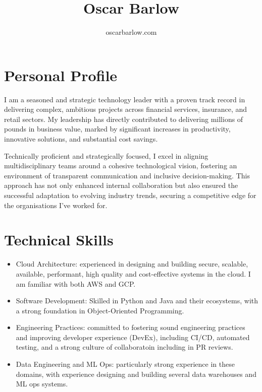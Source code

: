\documentclass[a4paper]{scrartcl}
\date{}
\begin{document}

\title{Oscar Barlow}
\subtitle{oscarbarlow.com}
\maketitle

\section*{Personal Profile}
I am a seasoned and strategic technology leader with a proven track record in
delivering complex, ambitious projects across financial services, insurance,
and retail sectors. My leadership has directly contributed to delivering
millions of pounds in business value, marked by significant increases in
productivity, innovative solutions, and substantial cost savings.

Technically proficient and strategically focused, I excel in aligning
multidisciplinary
teams around a cohesive technological vision, fostering an environment of
transparent communication and inclusive decision-making. This approach has not
only enhanced internal collaboration but also ensured the successful adaptation
to evolving industry trends, securing a competitive edge for the organisations
I've worked for.

\section*{Technical Skills}
\begin{itemize}
      \item Cloud Architecture: experienced in designing and building secure,
            scalable, available, performant, high quality and cost-effective systems in the
            cloud. I am familiar with both AWS and GCP.
      \item Software Development: Skilled in Python and Java and their
            ecosystems, with a
            strong foundation in Object-Oriented Programming.
      \item Engineering Practices: committed to fostering sound engineering
            practices and improving developer experience (DevEx), including CI/CD,
            automated testing, and a strong culture of collaboratoin including in PR
            reviews.
      \item Data Engineering and ML Ops: particularly strong experience in
            these domains, with experience designing and building several data warehouses
            and ML ops systems.
\end{itemize}
\end{document}
